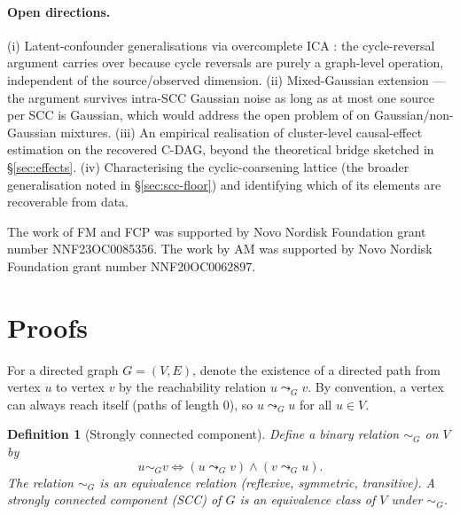\documentclass{article}
\newtheorem{definition}{Definition}
\begin{document}
\paragraph{Open directions.} (i) Latent-confounder generalisations via overcomplete ICA \citep{salehkaleybar2020learning,dai2026distributional}: the cycle-reversal argument carries over because cycle reversals are purely a graph-level operation, independent of the source/observed dimension. (ii) Mixed-Gaussian extension --- the argument survives intra-SCC Gaussian noise as long as at most one source per SCC is Gaussian, which would address the open problem of \citet[\S6]{lacerda2008discovering} on Gaussian/non-Gaussian mixtures. (iii) An empirical realisation of cluster-level causal-effect estimation on the recovered C-DAG, beyond the theoretical bridge sketched in \S\ref{sec:effects}. (iv) Characterising the cyclic-coarsening lattice (the broader generalisation noted in \S\ref{sec:scc-floor}) and identifying which of its elements are recoverable from data.


\begin{ack}
The work of FM and FCP was supported by Novo Nordisk Foundation grant number NNF23OC0085356.
The work by AM was supported by Novo Nordisk Foundation grant number NNF20OC0062897.

\end{ack}



\medskip

\small




\appendix

\section{Proofs}
\label{app:proofs}

For a directed graph $G = (V, E)$, denote the existence of a directed path from vertex $u$ to vertex $v$ by the reachability relation $u \leadsto_G v$. By convention, a vertex can always reach itself (paths of length 0), so $u \leadsto_G u$ for all $u \in V$.

\begin{definition}[Strongly connected component]
\label{def:scc}
Define a binary relation $\sim_G$ on $V$ by
\[
u \sim_G v \iff (u \leadsto_G v) \land (v \leadsto_G u).
\]
The relation $\sim_G$ is an equivalence relation (reflexive, symmetric, transitive). A \emph{strongly connected component} (SCC) of $G$ is an equivalence class of $V$ under $\sim_G$.
\end{definition}
\end{document}
